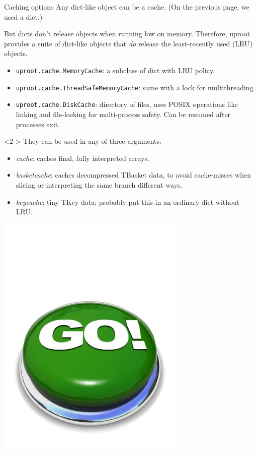\documentclass[aspectratio=169]{beamer}
\begin{document}
\begin{frame}{Caching options}
\vspace{0.25 cm}
Any dict-like object can be a cache. (On the previous page, we used a dict.)

\vspace{0.25 cm}
But dicts don't release objects when running low on memory. Therefore, uproot provides a suite of dict-like objects that {\it do} release the least-recently used (LRU) objects.

\vspace{0.25 cm}
\begin{itemize}
\item {\tt\small uproot.cache.MemoryCache}: a subclass of dict with LRU policy.
\item {\tt\small uproot.cache.ThreadSafeMemoryCache}: same with a lock for multithreading.
\item {\tt\small uproot.cache.DiskCache}: directory of files, uses POSIX operations like linking and file-locking for multi-process safety. Can be resumed after processes exit.
\end{itemize}

\begin{uncoverenv}<2->
\vspace{0.25 cm}
They can be used in any of three arguments:

\vspace{0.25 cm}
\begin{itemize}
\item {\it cache}: caches final, fully interpreted arrays.
\item {\it basketcache}: caches decompressed TBasket data, to avoid cache-misses when slicing or interpreting the same branch different ways.
\item {\it keycache}: tiny TKey data; probably put this in an ordinary dict without LRU.
\end{itemize}
\end{uncoverenv}

\vspace{-7.7 cm}
\hfill \includegraphics[width=1.5 cm]{safe.png}\hspace{-0.9 cm}
\vspace{7.7 cm}
\end{frame}
\end{document}
